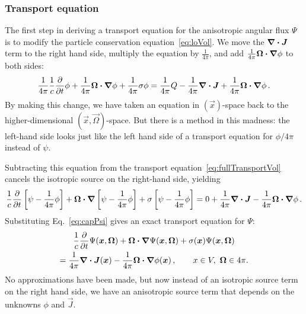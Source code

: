 \subsubsection{Transport equation}
The first step in deriving a transport equation for the anisotropic angular flux
$\Psi$ is to modify the particle conservation equation~\eqref{eq:loVol}. We move
the $\bm{\nabla}\bm{\cdot} \bm{J}$ term to the right hand side, multiply the equation by
$\frac{1}{4\pi}$, and add $\frac{1}{4\pi} \bm{\Omega}\bm{\cdot} \bm{\nabla} \phi$ to both
sides:
\begin{equation*}
 \frac{1}{4\pi}  \frac{1}{c} \frac{\partial }{\partial t} \phi
    + \frac{1}{4\pi} \bm{\Omega}\bm{\cdot} \bm{\nabla} \phi
    + \frac{1}{4\pi} \sigma \phi
    =
    \frac{1}{4\pi} Q
  - \frac{1}{4\pi} \bm{\nabla} \bm{\cdot}\bm{J}
  + \frac{1}{4\pi} \bm{\Omega}\bm{\cdot} \bm{\nabla} \phi \,.
\end{equation*}
By making this change, we have taken an equation in $(\vec{x})$-space back to
the higher-dimensional $(\vec{x}, \vec{\Omega})$-space. But there is a method
in this madness: the left-hand side looks just like the left hand side of a
transport equation for $\phi/4\pi$ instead of $\psi$.

Subtracting this equation from the transport
equation~\eqref{eq:fullTransportVol} cancels the isotropic source on the
right-hand side, yielding
\begin{equation*}
  \frac{1}{c} \frac{\partial }{\partial t}\left[ \psi
  - \frac{1}{4\pi} \phi \right]
    + \bm{\Omega}\bm{\cdot} \bm{\nabla} \left[ \psi
  - \frac{1}{4\pi} \phi \right]
  + \sigma \left[ \psi
  - \frac{1}{4\pi} \phi \right]
  = 0 + \frac{1}{4\pi} \bm{\nabla} \bm{\cdot}\bm{J} -
  \frac{1}{4\pi} \bm{\Omega}\bm{\cdot} \bm{\nabla} \phi\,.
\end{equation*}
Substituting Eq.~\eqref{eq:capPsi} gives an exact transport equation for $\Psi$:
\begin{multline} \label{eq:capPsiVol}
  \frac{1}{c} \frac{\partial }{\partial t}\Psi(\bm{x}, \bm{\Omega})
    + \bm{\Omega}\bm{\cdot} \bm{\nabla} \Psi(\bm{x}, \bm{\Omega})
    + \sigma(\bm{x}) \Psi(\bm{x}, \bm{\Omega})
  \\
  = \frac{1}{4\pi} \bm{\nabla} \bm{\cdot}\bm{J}(\bm{x}) -
  \frac{1}{4\pi} \bm{\Omega}\bm{\cdot} \bm{\nabla} \phi(\bm{x})\,,
  \qquad
x \in V,\ \bm{\Omega} \in 4\pi.
\end{multline}
No approximations have been made, but now instead of an isotropic source term
on the right hand side, we have an anisotropic source term that depends on the
unknowns $\phi$ and $\vec{J}$.

